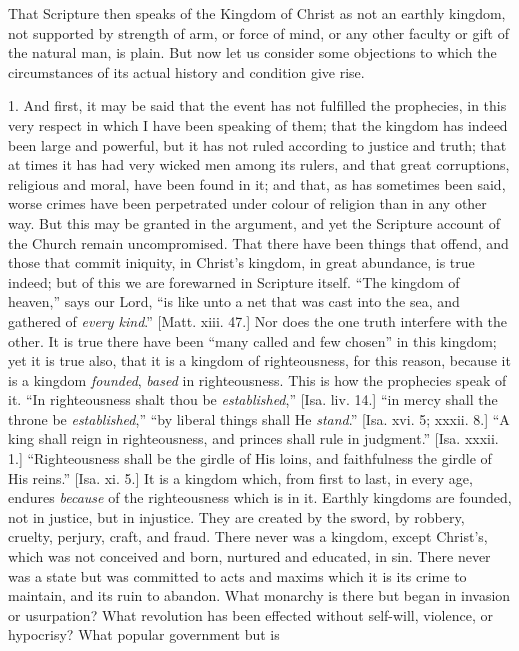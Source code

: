 That Scripture then speaks of the Kingdom of Christ as not an
earthly kingdom, not supported by strength of arm, or force of mind,
or any other faculty or gift of the natural man, is plain. But now let
us consider some objections to which the circumstances of its actual
history and condition give rise.

1. And first, it may be said that the event has not fulfilled the
prophecies, in this very respect in which I have been speaking of
them; that the kingdom has indeed been large and powerful, but it has
not ruled according to justice and truth; that at times it has had
very wicked men among its rulers, and that great corruptions,
religious and moral, have been found in it; and that, as has sometimes
been said, worse crimes have been perpetrated under colour of religion
than in any other way. But this may be granted in the argument, and
yet the Scripture account of the Church remain uncompromised. That
there have been things that offend, and those that commit iniquity, in
Christ's kingdom, in great abundance, is true indeed; but of this we
are forewarned in Scripture itself. ``The kingdom of heaven,''
says our Lord, ``is like unto a net that was cast into the sea,
and gathered of \emph{every kind}.'' [Matt. xiii. 47.] Nor does
the one truth interfere with the other. It is true there have been
``many called and few chosen'' in this kingdom; yet it is true
also, that it is a kingdom of righteousness, for this reason, because
it is a kingdom \emph{founded}, \emph{based} in righteousness. This is
how the prophecies speak of it. ``In righteousness shalt thou be \emph{established},''
[Isa. liv. 14.] ``in mercy shall the throne be \emph{established},''
``by liberal things shall He \emph{stand}.'' [Isa. xvi. 5;
xxxii. 8.] ``A king shall reign in righteousness, and princes
shall rule in judgment.'' [Isa. xxxii. 1.] ``Righteousness
shall be the girdle of His loins, and faithfulness the girdle of His
reins.'' [Isa. xi. 5.] It is a kingdom which, from first to last,
in every age, endures \emph{because} of the righteousness which is in
it. Earthly kingdoms are founded, not in justice, but in injustice.
They are created by the sword, by robbery, cruelty, perjury, craft,
and fraud. There never was a kingdom, except Christ's, which was not
conceived and born, nurtured and educated, in sin. There never was a
state but was committed to acts and maxims which it is its crime to
maintain, and its ruin to abandon. What monarchy is there but began in
invasion or usurpation? What revolution has been effected without
self-will, violence, or hypocrisy? What popular government but is

